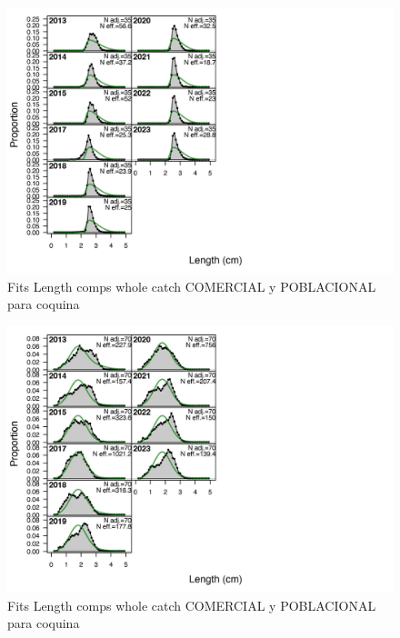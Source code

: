 \documentclass[
]{article}
\begin{document}
\begin{figure}[H]

{\centering \includegraphics{Dtrunculus_SS3_2024_files/figure-latex/fitpob-1} 

}

\caption{\label{fig:fitpob}Fits Length comps whole catch COMERCIAL y POBLACIONAL para coquina}\label{fig:fitpob-1}
\end{figure}
\begin{figure}[H]

{\centering \includegraphics{Dtrunculus_SS3_2024_files/figure-latex/fitpob-2} 

}

\caption{\label{fig:fitpob}Fits Length comps whole catch COMERCIAL y POBLACIONAL para coquina}\label{fig:fitpob-2}
\end{figure}
\end{document}
